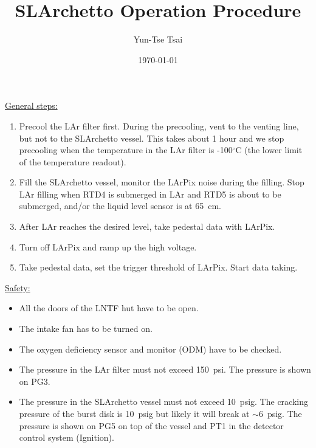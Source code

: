 \documentclass[letterpaper,11pt]{article}
\newcommand{\dC}        {$^\circ$C}
\begin{document}
\title{\textbf{SLArchetto Operation Procedure}}
\author{Yun-Tse Tsai}
\date{\today}

\maketitle


\underline{General steps:}
\begin{enumerate}
\setlength\itemsep{-0.2em}
\item Precool the LAr filter first.  During the precooling, vent to the venting line, 
but not to the SLArchetto vessel.  This takes about 1 hour and we stop precooling when the
temperature in the LAr filter is -100{\dC} (the lower limit of the temperature readout).
\item Fill the SLArchetto vessel, monitor the LArPix noise during the filling.
Stop LAr filling when RTD4 is submerged in LAr and RTD5 is about to be submerged, and/or
the liquid level sensor is at 65~cm.
\item After LAr reaches the desired level, take pedestal data with LArPix.
\item Turn off LArPix and ramp up the high voltage.
\item Take pedestal data, set the trigger threshold of LArPix.  Start data taking.
\end{enumerate}  

\underline{Safety:}
\begin{itemize}
\setlength\itemsep{-0.2em}
\item All the doors of the LNTF hut have to be open.
\item The intake fan has to be turned on.
\item The oxygen deficiency sensor and monitor (ODM) have to be checked.
\item The pressure in the LAr filter must not exceed 150~psi.  The pressure is shown on PG3.
\item The pressure in the SLArchetto vessel must not exceed 10~psig.  The cracking pressure of the burst disk is 10~psig
but likely it will break at $\sim$6~psig.
The pressure is shown on PG5 on top of the vessel and PT1 in the detector control system (Ignition).
\end{itemize}
\end{document}
